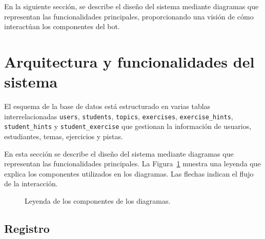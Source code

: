 En la siguiente sección, se describe el diseño del sistema mediante diagramas que representan las funcionalidades principales, proporcionando una visión de cómo interactúan los componentes del bot.

\section{Arquitectura y funcionalidades del sistema}\label{sec:features}

El esquema de la base de datos está estructurado en varias tablas interrelacionadas \texttt{users}, \texttt{students}, \texttt{topics}, \texttt{exercises}, \texttt{exercise\_hints}, \texttt{student\_hints} y \texttt{student\_exercise} que gestionan la información de usuarios, estudiantes, temas, ejercicios y pistas.

En esta sección se describe el diseño del sistema mediante diagramas que representan las funcionalidades principales. La Figura~\ref{fig:legend} muestra una leyenda que explica los componentes utilizados en los diagramas. Las flechas indican el flujo de la interacción.

\begin{figure}[h!]
  \centering
      \caption{Leyenda de los componentes de los diagramas.}\label{fig:legend}
\end{figure}

\subsection{Registro}


